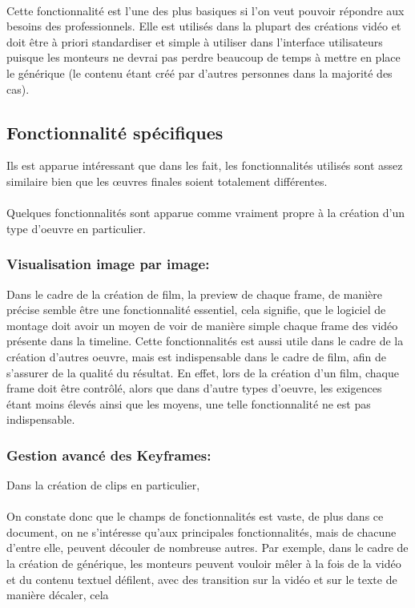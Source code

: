       \paragraph{}
        Cette fonctionnalité est l'une des plus basiques si
        l'on veut pouvoir répondre aux besoins des professionnels. Elle est utilisés
        dans la plupart des créations vidéo et doit être à priori standardiser et
        simple à utiliser dans l'interface utilisateurs puisque les monteurs ne devrai
        pas perdre beaucoup de temps à mettre en place le générique (le contenu étant
        créé par d'autres personnes dans la majorité des cas).

  \subsection{Fonctionnalité spécifiques}
    Ils est apparue intéressant que dans %
    les fait, les fonctionnalités utilisés sont assez similaire bien que
    les œuvres finales soient totalement différentes.

    \paragraph{}
    Quelques fonctionnalités sont apparue comme vraiment propre à la création
    d'un type d'oeuvre en particulier.

    \subsubsection{Visualisation image par image:}
      Dans le cadre de la création de film, la preview de chaque frame,
      de manière précise semble être une fonctionnalité essentiel,
      cela signifie, que le logiciel de montage doit avoir un moyen de
      voir de manière simple chaque frame des vidéo présente dans la
      timeline. Cette fonctionnalités est aussi utile dans le cadre de
      la création d'autres oeuvre, mais est indispensable dans le cadre
      de film, afin de s'assurer de la qualité du résultat. En effet,
      lors de la création d'un film, chaque frame doit être contrôlé,
      alors que dans d'autre types d'oeuvre, les exigences étant moins
      élevés ainsi que les moyens, une telle fonctionnalité ne est pas
      indispensable.

    \subsubsection{Gestion avancé des Keyframes:}
      Dans la création de clips en particulier, 

  \paragraph{}
    On constate donc que le champs de fonctionnalités est vaste, de plus dans ce
    document, on ne s'intéresse qu'aux principales fonctionnalités, mais de chacune
    d'entre elle, peuvent découler de nombreuse autres. Par exemple, dans le cadre
    de la création de générique, les monteurs peuvent vouloir mêler à la fois de la
    vidéo et du contenu textuel défilent, avec des transition sur la vidéo et sur le
    texte de manière décaler, cela
